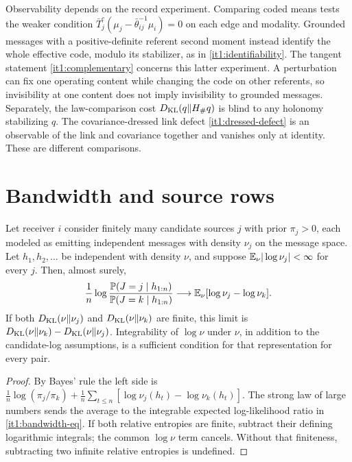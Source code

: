 \documentclass[11pt,letterpaper]{report}
\begin{document}
Observability depends on the record experiment. Comparing coded means tests the weaker condition $\bar T_j^c(\mu_j-\bar\theta_{ij}^{-1}\mu_i)=0$ on each edge and modality. Grounded messages with a positive-definite referent second moment instead identify the whole effective code, modulo its stabilizer, as in \cref{it1:identifiability}. The tangent statement \cref{it1:complementary} concerns this latter experiment. A perturbation can fix one operating content while changing the code on other referents, so invisibility at one content does not imply invisibility to grounded messages. Separately, the law-comparison cost $D_{\mathrm{KL}}(q\Vert H_\#q)$ is blind to any holonomy stabilizing $q$. The covariance-dressed link defect \cref{it1:dressed-defect} is an observable of the link and covariance together and vanishes only at identity. These are different comparisons.

\chapter{Bandwidth and source rows}
\label{it1:ch-bandwidth}

Let receiver $i$ consider finitely many candidate sources $j$ with prior $\pi_j>0$, each modeled as emitting independent messages with density $\nu_j$ on the message space. Let $h_1,h_2,\ldots$ be independent with density $\nu$, and suppose $\mathbb E_\nu|\log\nu_j|<\infty$ for every $j$. Then, almost surely,
\begin{equation}
\frac1n\log\frac{\mathbb P(J=j\mid h_{1:n})}{\mathbb P(J=k\mid h_{1:n})}\longrightarrow\mathbb E_\nu[\log\nu_j-\log\nu_k].
\label{it1:bandwidth-eq}
\end{equation}
If both $D_{\mathrm{KL}}(\nu\Vert\nu_j)$ and $D_{\mathrm{KL}}(\nu\Vert\nu_k)$ are finite, this limit is $D_{\mathrm{KL}}(\nu\Vert\nu_k)-D_{\mathrm{KL}}(\nu\Vert\nu_j)$. Integrability of $\log\nu$ under $\nu$, in addition to the candidate-log assumptions, is a sufficient condition for that representation for every pair.
\begin{proof}
By Bayes' rule the left side is $\frac1n\log(\pi_j/\pi_k)+\frac1n\sum_{t\leq n}[\log\nu_j(h_t)-\log\nu_k(h_t)]$. The strong law of large numbers sends the average to the integrable expected log-likelihood ratio in \cref{it1:bandwidth-eq}. If both relative entropies are finite, subtract their defining logarithmic integrals; the common $\log\nu$ term cancels. Without that finiteness, subtracting two infinite relative entropies is undefined.
\end{proof}
\end{document}
